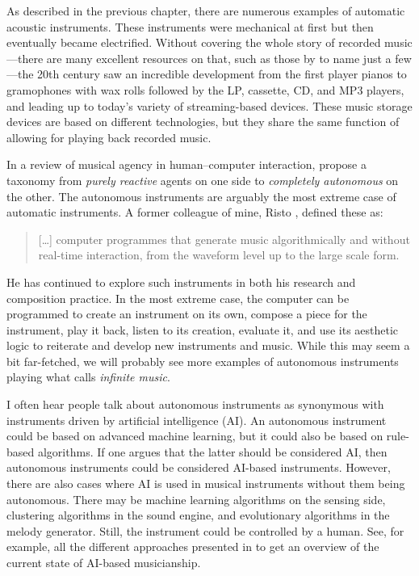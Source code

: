 As described in the previous chapter, there are numerous examples of automatic acoustic instruments. These instruments were mechanical at first but then eventually became electrified. Without covering the whole story of recorded music---there are many excellent resources on that, such as those by \citet{wurtzler_electric_2007,katz_capturing_2010,devine_decomposed_2019} to name just a few---the 20th century saw an incredible development from the first player pianos to gramophones with wax rolls followed by the LP, cassette, CD, and MP3 players, and leading up to today's variety of streaming-based devices. These music storage devices are based on different technologies, but they share the same function of allowing for playing back recorded music.

In a review of musical agency in human--computer interaction, \citet{tatar_musical_2019} propose a taxonomy from \emph{purely reactive} agents on one side to \emph{completely autonomous} on the other. The autonomous instruments are arguably the most extreme case of automatic instruments. A former colleague of mine, Risto \citet[p. i]{holopainen_self-organised_2012}, defined these as:

\begin{quote}
	[\ldots] computer programmes that generate music algorithmically and without real-time interaction, from the waveform level up to the large scale form.
\end{quote}

He has continued to explore such instruments in both his research and composition practice. In the most extreme case, the computer can be programmed to create an instrument on its own, compose a piece for the instrument, play it back, listen to its creation, evaluate it, and use its aesthetic logic to reiterate and develop new instruments and music. While this may seem a bit far-fetched, we will probably see more examples of autonomous instruments playing what \citet{harper_infinite_2011} calls \emph{infinite music}.

I often hear people talk about autonomous instruments as synonymous with instruments driven by artificial intelligence (AI). An autonomous instrument could be based on advanced machine learning, but it could also be based on rule-based algorithms. If one argues that the latter should be considered AI, then autonomous instruments could be considered AI-based instruments. However, there are also cases where AI is used in musical instruments without them being autonomous. There may be machine learning algorithms on the sensing side, clustering algorithms in the sound engine, and evolutionary algorithms in the melody generator. Still, the instrument could be controlled by a human. See, for example, all the different approaches presented in \citet{miranda_handbook_2021} to get an overview of the current state of AI-based musicianship.


